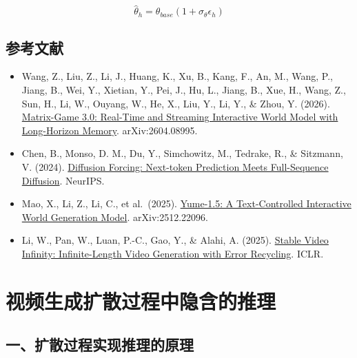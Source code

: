 \[
\hat{\theta}_h = \theta_{base}(1 + \sigma_{\theta}\epsilon_h)
\]

\hypertarget{ux53c2ux8003ux6587ux732e-144}{%
\subsection{参考文献}\label{ux53c2ux8003ux6587ux732e-144}}

\vspace{0.25em}
\begin{itemize}
\tightlist
\item
  Wang, Z., Liu, Z., Li, J., Huang, K., Xu, B., Kang, F., An, M., Wang, P., Jiang, B., Wei, Y., Xietian, Y., Pei, J., Hu, L., Jiang, B., Xue, H., Wang, Z., Sun, H., Li, W., Ouyang, W., He, X., Liu, Y., Li, Y., \& Zhou, Y. (2026). \href{https://arxiv.org/abs/2604.08995}{Matrix-Game 3.0: Real-Time and Streaming Interactive World Model with Long-Horizon Memory}. arXiv:2604.08995.
\item
  Chen, B., Monso, D. M., Du, Y., Simchowitz, M., Tedrake, R., \& Sitzmann, V. (2024). \href{https://arxiv.org/abs/2407.01392}{Diffusion Forcing: Next-token Prediction Meets Full-Sequence Diffusion}. NeurIPS.
\item
  Mao, X., Li, Z., Li, C., et al.~(2025). \href{https://arxiv.org/abs/2512.22096}{Yume-1.5: A Text-Controlled Interactive World Generation Model}. arXiv:2512.22096.
\item
  Li, W., Pan, W., Luan, P.-C., Gao, Y., \& Alahi, A. (2025). \href{https://arxiv.org/abs/2510.09212}{Stable Video Infinity: Infinite-Length Video Generation with Error Recycling}. ICLR.
\end{itemize}

\clearpage

\hypertarget{ux89c6ux9891ux751fux6210ux6269ux6563ux8fc7ux7a0bux4e2dux9690ux542bux7684ux63a8ux7406}{%
\section{视频生成扩散过程中隐含的推理}\label{ux89c6ux9891ux751fux6210ux6269ux6563ux8fc7ux7a0bux4e2dux9690ux542bux7684ux63a8ux7406}}

\hypertarget{ux4e00ux6269ux6563ux8fc7ux7a0bux5b9eux73b0ux63a8ux7406ux7684ux539fux7406}{%
\subsection{一、扩散过程实现推理的原理}\label{ux4e00ux6269ux6563ux8fc7ux7a0bux5b9eux73b0ux63a8ux7406ux7684ux539fux7406}}

